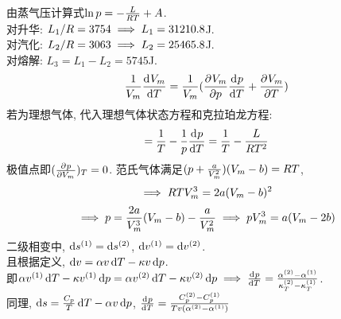 \documentclass[UTF8,9pt]{ctexart}
\begin{document}
由蒸气压计算式$\ln p=-\f{L}{RT}+A$.\\
对升华: $L_1/R=3754 \ip L_1=31210.8$J. \\
对汽化: $L_2/R=3063 \ip L_2=25465.8$J.\\
对熔解: $L_3=L_1-L_2=5745$J.\\
$$\ff{V_m}\dd{V_m}{T}=\ff{V_m}(\pp{V_m}{p}\dd{p}{T}+\pp{V_m}{T})$$
若为理想气体, 代入理想气体状态方程和克拉珀龙方程: 
$$=\ff{T}-\ff{p}\dd{p}{T}=\ff{T}-\f{L}{RT^2}$$
极值点即$(\pp{p}{V_m})_T=0$. 范氏气体满足$(p+\f{a}{V_m^2})(V_m-b)=RT$,
$$\ip RTV_m^3=2a(V_m-b)^2$$
$$\ip p=\f{2a}{V_m^3}(V_m-b)-\f{a}{V_m^2} \ip pV_m^3=a(V_m-2b)$$
二级相变中, $\d s^{(1)}=\d s^{(2)}$, $\d v^{(1)}=\d v^{(2)}$. \\
且根据定义, $\d v=\a v\d T-\k v\d p$.\\
即$\a v^{(1)}\d T-\k v^{(1)}\d p=\a v^{(2)}\d T-\k v^{(2)}\d p \ip \dd{p}{T} = \f{\a^{(2)}-\a^{(1)}}{\k_T^{(2)}-\k_T^{(1)}}$.\\
同理, $\d s=\f{C_p}{T}\d T-\a v\d p$, $\dd{p}{T}=\f{C_p^{(2)}-C_p^{(1)}}{Tv(\a^{(2)}-\a^{(1)})}$
\end{document}
